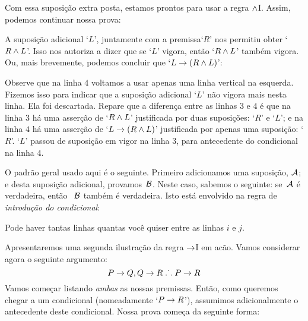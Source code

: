 Com essa  suposição extra posta, estamos prontos para usar a regra  $\wedge$I.  Assim, podemos continuar nossa prova: 
	\begin{fitchproof}
		\open
	\end{fitchproof}
A suposição adicional `$L$’, juntamente com a premissa`$R$' nos permitiu obter `$R \wedge L$'.  Isso nos autoriza a dizer que se `$L$’ vigora, então `$R \wedge L$' também vigora. Ou, mais brevemente, podemos concluir que  `$L \rightarrow (R \wedge L)$':	

\begin{fitchproof}
		\hypo{r}{R}
		\open
			\hypo{l}{L}
			\ai{r, l}
			\close
		\ci{l-rl}
	\end{fitchproof}


Observe que na linha $4$ voltamos a usar apenas uma linha vertical na esquerda. Fizemos isso para indicar que a suposição adicional `$L$' não vigora mais nesta linha. Ela foi descartada. Repare que a diferença entre as linhas $3$ e $4$ é que na linha $3$ há uma asserção  de `$R \wedge L$' justificada por duas suposições:  `$R$' e `$L$'; e na linha $4$ há uma asserção de  `$L \rightarrow (R \wedge L)$' justificada por apenas uma suposição:  `$R$'. `$L$' passou de suposição em vigor na linha $3$, para antecedente do condicional na linha $4$.

 O padrão geral usado aqui é o seguinte. Primeiro adicionamos uma suposição, $\mathcal{A}$;  e desta suposição  adicional, provamos~$\mathcal{B}$. Neste caso, sabemos o seguinte: se~$\mathcal{A}$ é verdadeira, então ~$\mathcal{B}$ também é verdadeira.  Isto está envolvido na regra de \textit{introdução do condicional}:


\factoidbox{
	\begin{fitchproof}
		\open
			\hypo[i]{a}{\meta{A}} 
			\have[j]{b}{\meta{B}}
		\close
		\have[\ ]{ab}{\meta{A}\eif\meta{B}}\ci{a-b}
	\end{fitchproof}}
Pode haver tantas linhas quantas você quiser entre as linhas $i$ e $j$.  

Apresentaremos uma segunda ilustração da regra $\rightarrow$I em acão. Vamos considerar  agora o seguinte argumento:
	$$P \rightarrow Q, Q \rightarrow R \mathrel{\ldotp\dot{}\,\ldotp} P \rightarrow R$$
Vamos começar listando \emph{ambas} as nossas premissas. Então, como queremos chegar a um condicional (nomeadamente `$P \rightarrow R$'),  assumimos adicionalmente o antecedente deste condicional.
Nossa prova começa da seguinte forma:

